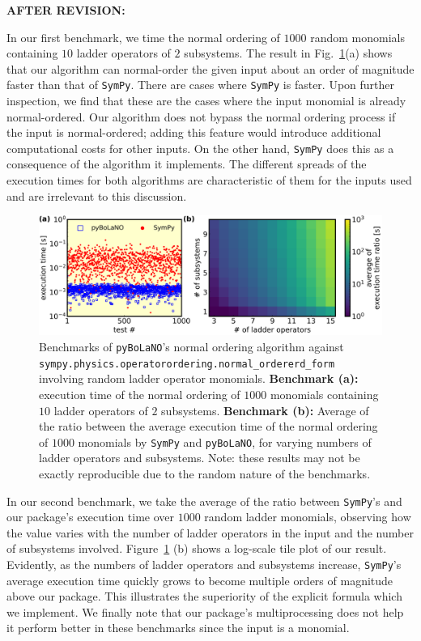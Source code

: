 \documentclass[12pt, a4paper]{article}
\newenvironment{revision}{%
\color{red}
}
{}
\newenvironment{revpost}{%
\textbf{{AFTER REVISION:}}
\par
}
{}
\begin{document}
\begin{revpost}
\begin{revision}
In our first benchmark, we time the normal ordering of $1000$ random monomials containing $10$ ladder operators of $2$ subsystems. The result in Fig.~\ref{fig_2}(a) shows that our algorithm can normal-order the given input about an order of magnitude faster than that of \texttt{SymPy}. There are cases where \texttt{SymPy} is faster.  Upon further inspection, we find that these are the cases where the input monomial is already normal-ordered. Our algorithm does not bypass the normal ordering process if the input is normal-ordered; adding this feature would introduce additional computational costs for other inputs. On the other hand, \texttt{SymPy} does this as a consequence of the algorithm it implements. The different spreads of the execution times for both algorithms are characteristic of them for the inputs used and are irrelevant to this discussion. 

\setcounter{figure}{1}
\begin{figure}[!t]
    \centering
    \includegraphics[width=\linewidth]{fig_2.png}
    \caption{\begin{revision}Benchmarks of \texttt{pyBoLaNO}'s normal ordering algorithm against \texttt{sympy.physics.operatorordering.normal\_ordererd\_form} involving random ladder operator monomials. \textbf{Benchmark (a):} execution time of the normal ordering of $1000$ monomials containing $10$ ladder operators of $2$ subsystems. \textbf{Benchmark (b):} Average of the ratio between the average execution time of the normal ordering of $1000$ monomials by \texttt{SymPy} and \texttt{pyBoLaNO}, for varying numbers of ladder operators and subsystems. Note: these results may not be exactly reproducible due to the random nature of the benchmarks.\end{revision}}
    \label{fig_2}
\end{figure}

In our second benchmark, we take the average of the ratio between \texttt{SymPy}'s and our package's execution time over $1000$ random ladder monomials, observing how the value varies with the number of ladder operators in the input and the number of subsystems involved. Figure~\ref{fig_2} (b) shows a log-scale tile plot of our result. Evidently, as the numbers of ladder operators and subsystems increase, \texttt{SymPy}'s average execution time quickly grows to become multiple orders of magnitude above our package. This illustrates the superiority of the explicit formula which we implement.  We finally note that our package's multiprocessing does not help it perform better in these benchmarks since the input is a monomial. \end{revision}


\end{revpost}
\end{document}
